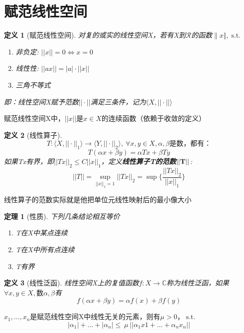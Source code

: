 \documentclass[12pt, a4paper, oneside, fontset=windows]{ctexbook}
\newtheorem{theorem}{定理}[section]
\newtheorem{definition}{定义}[section]
\DeclareMathOperator{\st}{\mathrm{s.t.}}
\begin{document}
    \section{赋范线性空间}
    \begin{definition}[赋范线性空间]
        对复的或实的线性空间X，若有X到$\mathcal{R}$的函数$\| x \Vert , \st$
        \begin{enumerate}
            \item 非负定: $||x||=0 \iff x=0$
            \item 线性性: $||ax||=|a|\cdot ||x||$
            \item 三角不等式
        \end{enumerate}
        即：线性空间X赋予范数$||\cdot ||$满足三条件，记为$\langle X,||\cdot || \rangle$
    \end{definition}

    赋范线性空间X中，$||x||$是$x\in X$的连续函数（依赖于收敛的定义）\\
    \begin{definition}[线性算子]
        \[T:\langle X,||\cdot ||_1\rangle \to \langle Y,||\cdot||_2 \rangle,\ \forall x,y\in X,\alpha,\beta \text{是数，都有：}\]
        \[
        T(\alpha x+\beta y)=\alpha Tx+\beta Ty\]
        如果Tx有界，即$||Tx||_2 \le C||x||_1$，定义\textbf{线性算子T的范数${\bf ||T||}$}:
        \[
            ||T||=\sup_{||x||_1=1}||Tx||_2=\sup \{\dfrac{||Tx||_2}{||x||_1}\}
        \]
    \end{definition}
    \begin{tcolorbox}
        线性算子的范数实际就是他把单位元线性映射后的最小像大小
    \end{tcolorbox}
    \begin{theorem}[性质]
        下列几条结论相互等价
        \begin{enumerate}
            \item T在X中某点连续
            \item T在X中所有点连续
            \item T有界
        \end{enumerate}
    \end{theorem}
    \begin{definition}[线性泛函]
        线性空间X上的复值函数$f:X\to \mathbb{C}$称为线性泛函，如果$\forall x,y\in X,\text{数}\alpha ,\beta $有\[
        f(\alpha x+\beta y)=\alpha f(x)+\beta f(y)
        \]
    \end{definition}

    \begin{tcolorbox}[title code={123}]
        $x_1,\dots,x_n$是赋范线性空间X中线性无关的元素，则有$\mu >0，\st$
        \[|\alpha_1|+\dots +|\alpha_n| \le \ \mu \  ||\alpha_1 x1+\dots +\alpha_n x_n||\]
    \end{tcolorbox}
\end{document}
